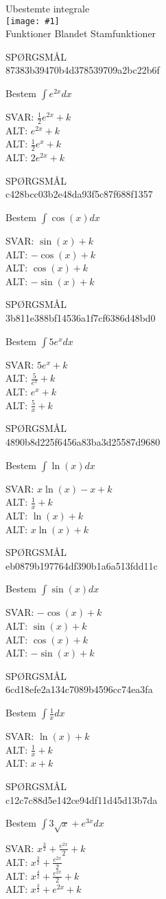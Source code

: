 \documentclass[]{article}
\newcounter{spgcounter}
\newenvironment{question}[2]{\addtocounter{spgcounter}{1} SPØRGSMÅL \thespgcounter\\}{\hspace{50px}}
\newcommand{\name}[1]{{\huge #1}\\}
\newcommand{\tag}[1]{#1}
\newcommand{\cover}[1]{\texttt{[image: \#1]}\\}
\newcommand{\answer}[1]{{\color{green} SVAR: #1}\\}
\newcommand{\alt}[1]{{\color{red} ALT: #1}\\}
\begin{document}
\name{Ubestemte integrale}
\cover{sinintegral.png}
\tag{Funktioner}
\tag{Blandet}
\tag{Stamfunktioner}

\begin{question}{multi}\id{87383b39470b4d378539709a2bc22b6f}

Bestem $\int{e^{2x}} dx$

\answer{$\frac{1}{2}e^{2x} + k$}
\alt{$e^{2x} + k$}
\alt{$\frac{1}{2}e^{x} + k$}
\alt{$2e^{2x} + k$}

\end{question}

\begin{question}{multi}\id{c428bcc03b2e48da93f5c87f688f1357}

Bestem $\int{\cos(x)} dx$

\answer{$\sin(x) + k$}
\alt{$-\cos(x) + k$}
\alt{$\cos(x) + k$}
\alt{$-\sin(x) + k$}

\end{question}

\begin{question}{multi}\id{3b811e388bf14536a1f7cf6386d48bd0}

Bestem $\int{5e^x} dx$

\answer{$5e^x + k$}
\alt{$\frac{5}{e^x} + k$}
\alt{$e^x + k$}
\alt{$\frac{5}{x} + k$}

\end{question}

\begin{question}{multi}\id{4890b8d225f6456a83ba3d25587d9680}

Bestem $\int{\ln(x)} dx$

\answer{$x\ln(x) - x + k$}
\alt{$\frac{1}{x} + k$}
\alt{$\ln(x) + k$}
\alt{$x\ln(x) + k$}

\end{question}

\begin{question}{multi}\id{eb0879b197764df390b1a6a513fdd11c}

Bestem $\int{\sin(x)} dx$

\answer{$-\cos(x) + k$}
\alt{$\sin(x) + k$}
\alt{$\cos(x) + k$}
\alt{$-\sin(x) + k$}

\end{question}

\begin{question}{multi}\id{6cd18efe2a134c7089b4596cc74ea3fa}

Bestem $\int \frac{1}{x} dx $

\answer{$\ln(x) + k$}
\alt{$\frac{1}{x} + k$}
\alt{$x + k$}

\end{question}

\begin{question}{multi}\id{c12c7c88d5e142ce94df11d45d13b7da}

Bestem $\int 3 \sqrt{x} + e^{3 x} dx$

\answer{$x^{\frac{3}{2}} + \frac{e^{2x}}{2} + k$}
\alt{$x^{\frac{3}{2}} + \frac{e^{2x}}{2}$}
\alt{$x^{\frac{4}{2}} + \frac{e^{2x}}{2} + k$}
\alt{$x^{\frac{3}{2}} + e^{2x} + k$}

\end{question}
\end{document}
